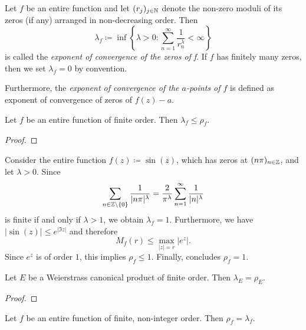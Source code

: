 \begin{definition}
    Let $f$ be an entire function and let $(r_j)_{j \in \mathbb{N}}$ denote the non-zero moduli of its zeros (if any) arranged in non-decreasing order. Then
    $$ \lambda_f \coloneqq \inf \left\{ \lambda > 0 : \sum_{n=1}^\infty \frac{1}{r^\lambda_n} < \infty \right\} $$
    is called the \emph{exponent of convergence of the zeros of f}. If $f$ has finitely many zeros, then we set $\lambda_f = 0$ by convention.

    Furthermore, the \emph{exponent of convergence of the $a$-points of $f$} is defined as exponent of convergence of zeros of $f(z) - a$.
\end{definition}

\begin{theorem} \label{thm:inequality-order-exponent-of-convergence}
    Let $f$ be an entire function of finite order. Then $\lambda_f \leq \rho_f$.
\end{theorem}

\begin{proof}
\end{proof}

\begin{example} \label{exm:exponent-of-convergence}
    Consider the entire function $f(z) \coloneqq \sin(z)$, which has zeros at $(n \pi)_{n \in \mathbb{Z}}$, and let $\lambda > 0$. Since
    $$ \sum_{n \in \mathbb{Z} \setminus \{0\}} \frac{1}{\vert n \pi \vert^\lambda} = \frac{2}{\pi^\lambda} \sum_{n=1}^\infty \frac{1}{\vert n \vert^\lambda} $$
    is finite if and only if $\lambda > 1$, we obtain $\lambda_f = 1$. Furthermore, we have $\vert \sin(z) \vert \leq e^{\vert \Im z \vert}$
    and therefore
    $$ M_f(r) \leq \max_{\vert z \vert = r} \vert e^z \vert. $$
    Since $e^z$ is of order $1$, this implies $\rho_f \leq 1$. Finally,  concludes $\rho_f = 1$.
\end{example}

\begin{theorem} \label{thm:exponent-of-convergence-weierstrass-product}
    Let $E$ be a Weierstrass canonical product of finite order. Then $\lambda_E = \rho_E$.
\end{theorem}

\begin{proof}
\end{proof}

\begin{theorem} \label{thm:finite-non-integer-order-equals-exponent-of-convergence}
    Let $f$ be an entire function of finite, non-integer order. Then $\rho_f = \lambda_f$.
\end{theorem}

